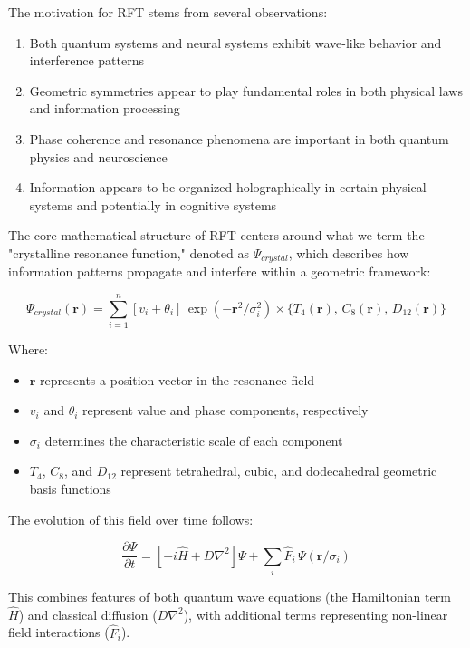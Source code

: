 \documentclass[12pt,letterpaper]{article}
\begin{document}
The motivation for RFT stems from several observations:

\begin{enumerate}
    \item Both quantum systems and neural systems exhibit wave-like behavior and interference patterns
    \item Geometric symmetries appear to play fundamental roles in both physical laws and information processing
    \item Phase coherence and resonance phenomena are important in both quantum physics and neuroscience
    \item Information appears to be organized holographically in certain physical systems and potentially in cognitive systems
\end{enumerate}

The core mathematical structure of RFT centers around what we term the "crystalline resonance function," denoted as $\Psi_{crystal}$, which describes how information patterns propagate and interfere within a geometric framework:

\begin{equation}
\Psi_{crystal}(\mathbf{r}) = \sum_{i=1}^{n} [v_i + \theta_i] \, \exp(-\mathbf{r}^2/\sigma_i^2) \times \{T_4(\mathbf{r}), \, C_8(\mathbf{r}), \, D_{12}(\mathbf{r})\}
\end{equation}

Where:
\begin{itemize}
    \item $\mathbf{r}$ represents a position vector in the resonance field
    \item $v_i$ and $\theta_i$ represent value and phase components, respectively
    \item $\sigma_i$ determines the characteristic scale of each component
    \item $T_4$, $C_8$, and $D_{12}$ represent tetrahedral, cubic, and dodecahedral geometric basis functions
\end{itemize}

The evolution of this field over time follows:

\begin{equation}
\frac{\partial \Psi}{\partial t} = [-i\hat{H} + D\nabla^2]\Psi + \sum_i \hat{F}_i \, \Psi(\mathbf{r}/\sigma_i)
\end{equation}

This combines features of both quantum wave equations (the Hamiltonian term $\hat{H}$) and classical diffusion ($D\nabla^2$), with additional terms representing non-linear field interactions ($\hat{F}_i$).
\end{document}
